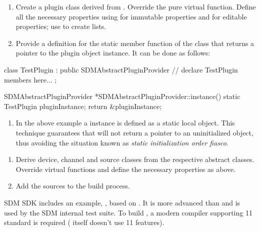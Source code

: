 \documentclass[a4paper,12pt,twoside,extrafontsizes]{memoir}
\begin{document}
\begin{enumerate}
	\item Create a plugin class derived from . Override the  pure virtual function. Define all the necessary properties using  for immutable properties and  for editable properties; use  to create lists.
	\item Provide a definition for the  static member function of the  class that returns a pointer to the plugin object instance. It can be done as follows:
\end{enumerate}
	
\begin{breakshellcmds}\begin{ccode}
class TestPlugin : public SDMAbstractPluginProvider {
// declare TestPlugin members here...
};

SDMAbstractPluginProvider *SDMAbstractPluginProvider::instance() {
    static TestPlugin pluginInstance;
    return &pluginInstance;
}
\end{ccode}\end{breakshellcmds}

\begin{enumerate}[label={}]
	\item In the above example a  instance is defined as a static local object. This technique guarantees that  will not return a pointer to an uninitialized object, thus avoiding the situation known as \emph{static initialization order fiasco}.
\end{enumerate}
\begin{enumerate}[start=3]
	\item Derive device, channel and source classes from the respective abstract classes. Override virtual functions and define the necessary properties as above.
	\item Add the  sources to the build process.
\end{enumerate}

SDM SDK includes an example, , based on . It is more advanced than  and is used by the SDM internal test suite. To build , a modern compiler supporting \cplusplus{}11 standard is required ( itself doesn't use \cplusplus{}11 features).
\end{document}
